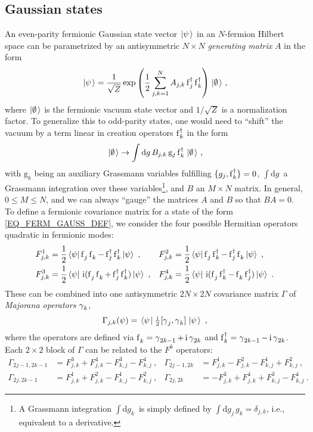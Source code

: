 \documentclass[letter]{article}
\newcommand{\intd}[1]{\int\mathrm{d}#1\,}
\begin{document}
\subsection{Gaussian states}
An even-parity fermionic Gaussian state vector $\left.\left|{\psi}\right.\right\rangle$ in an $N$-fermion Hilbert space can be parametrized by an antisymmetric $N \times N$ \emph{generating matrix} $A$ in the form
\begin{equation}
\label{EQ_FERM_GAUSS_DEF}
\left.\left|{\psi}\right.\right\rangle = \frac{1}{\sqrt{Z}} \exp\left( \frac{1}{2} \sum_{j,k=1}^N A_{j,k} \operatorname{f}^\dagger_j \operatorname{f}^\dagger_k \right) {\left.\left|{\emptyset}\right.\right\rangle} \ ,
\end{equation}
where ${\left.\left|{\emptyset}\right.\right\rangle}$ is the fermionic vacuum state vector and $1/\sqrt{Z}$ is a normalization factor. To generalize this to odd-parity states, one would need to ``shift'' the vacuum by a term linear in creation operators $\operatorname{f}^\dagger_k$ in the form
\begin{equation}
\vacket \to \intd g B_{j,k}\, \mathrm{g}_j \fd_k \vacket \ ,
\end{equation}
with $\mathrm{g}_k$ being an auxiliary Grassmann variables fulfilling $\{ g_j, \operatorname{f}^\dagger_k \} = 0$, $\intd g$ a Grassmann integration over these variables\footnote{A Grassmann integration $\intd{g_k}$ is simply defined by $\intd{g_j} g_k = \delta_{j,k}$, i.e., equivalent to a derivative.}, and $B$ an $M \times N$ matrix. In general, $0 \leq M \leq N$, and we can always ``gauge'' the matrices $A$ and $B$ so that $B A = 0$. 
To define a fermionic covariance matrix for a state of the form \eqref{EQ_FERM_GAUSS_DEF}, we consider the four possible Hermitian operators quadratic in fermionic modes:
\begin{align}
F^1_{j,k} &= \frac{1}{2}\sandwich{\psi}{\fe_j \fe_k - \fd_j \fd_k}{\psi} \ , &
F^2_{j,k} &= \frac{1}{2}\sandwich{\psi}{\fe_j \fd_k - \fd_j \fe_k}{\psi} \ , \\
F^3_{j,k} &= \frac{1}{2}\sandwich{\psi}{\i(\fe_j \fe_k + \fd_j \fd_k)}{\psi}  \ , &
F^4_{j,k} &= \frac{1}{2}\sandwich{\psi}{\i(\fe_j \fd_k - \fe_k \fd_j)}{\psi} \ .
\end{align}
These can be combined into one antisymmetric $2N \times 2N$ covariance matrix $\Gamma$ of \emph{Majorana operators} $\operatorname{\gamma}_k$,
\begin{equation}
\Gamma_{j,k}(\psi) =\left.\left\langle{\psi}\right.\right|\tfrac{\,\mathrm{i}\,}{2} [\operatorname{\gamma}_j,\operatorname{\gamma}_k]\left.\left|{\psi}\right.\right\rangle \ ,
\end{equation}
where the operators are defined via $\fe_k = \m_{2k-1} + \i \m_{2k}$ and  $\operatorname{f}^\dagger_k = \operatorname{\gamma}_{2k-1} - \,\mathrm{i} \operatorname{\gamma}_{2k}$.
Each $2 \times 2$ block of $\Gamma$ can be related to the $F^k$ operators:
\begin{align}
\Gamma_{2j-1,2k-1} &= F^3_{j,k} + F^4_{j,k} - F^3_{k,j} - F^4_{k,j} \ ,&
\Gamma_{2j-1,2k} &= F^1_{j,k} - F^2_{j,k} - F^1_{k,j} + F^2_{k,j} \ ,\\
\Gamma_{2j,2k-1} &= F^1_{j,k} + F^2_{j,k} - F^1_{k,j} - F^2_{k,j} \ ,&
\Gamma_{2j,2k} &= -F^3_{j,k} + F^4_{j,k} + F^3_{k,j} - F^4_{k,j} \ .
\end{align}
\end{document}
